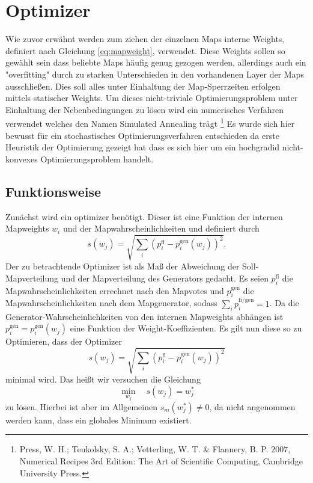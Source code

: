 \section{Optimizer}

\label{sub:optimizer}
Wie zuvor erwähnt werden zum ziehen der einzelnen Maps interne Weights, definiert nach Gleichung \ref{eq:mapweight}, verwendet.
Diese Weights sollen so gewählt sein dass beliebte Maps häufig genug gezogen werden, allerdings auch ein "overfitting" durch zu starken Unterschieden in den vorhandenen Layer der Maps ausschließen.
Dies soll alles unter Einhaltung der Map-Sperrzeiten erfolgen mittels statischer Weights.
Um dieses nicht-triviale Optimierungsproblem unter Einhaltung der Nebenbedingungen zu lösen wird ein numerisches Verfahren verwendet welches den Namen \glqq Simulated Annealing \grqq trägt \footnote[1]{Press, W. H.; Teukolsky, S. A.; Vetterling, W. T. \& Flannery, B. P. \(2007\), Numerical Recipes 3rd Edition: The Art of Scientific Computing, Cambridge University Press.}
Es wurde sich hier bewusst für ein stochastisches Optimierungsverfahren entschieden da erste Heuristik der Optimierung gezeigt hat dass es sich hier um ein hochgradid nicht-konvexes Optimierungsproblem handelt.

\subsection{Funktionsweise}
Zunächst wird ein optimizer benötigt. 
Dieser ist eine Funktion der internen Mapweights $w_i$ und der Mapwahrscheinlichkeiten und definiert durch 
\begin{equation}
    s(w_j)=\sqrt{\sum_i \left(p^\text{fi}_i - p^\text{gen}_i(w_j)\right)^2}.
\end{equation}
Der zu betrachtende Optimizer ist als Maß der Abweichung der \glqq{}Soll-Mapverteilung\grqq{} und der Mapverteilung des Generators gedacht.
Es seien $p_i^\text{fi}$ die Mapwahrscheinlichkeiten errechnet nach den Mapvotes und $p_i^\text{gen}$ die Mapwahrscheinlichkeiten nach dem Mapgenerator, sodass $\sum_i p_i^\text{fi/gen}=1$.
Da die Generator-Wahrscheinlichkeiten von den internen Mapweights abhängen ist $p_i^\text{gen}=p_i^\text{gen}(w_j)$ eine Funktion der Weight-Koeffizienten.
Es gilt nun diese so zu Optimieren, dass der Optimizer
\begin{equation}
    s(w_j) = \sqrt{\sum_i \left(p_i^\text{fi}-p_i^\text{gen}(w_j)\right)^2}
\end{equation}
minimal wird.
Das heißt wir versuchen die Gleichung
\begin{equation}
    \underset{w_j}{\min}\quad s(w_j) = w^*_j
\end{equation}
zu lösen.
Hierbei ist aber im Allgemeinen $s_m(w^*_j) \neq 0$, da nicht angenommen werden kann, dass ein globales Minimum existiert.

